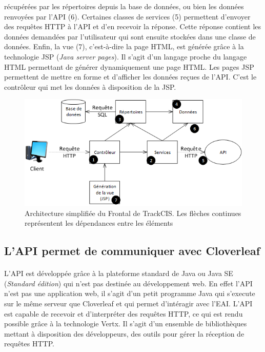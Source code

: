 			récupérées par les répertoires depuis la base de données, ou bien les
			données renvoyées par l'API (6). Certaines classes de services (5)
			permettent d'envoyer des requêtes HTTP à l'API et d'en recevoir la réponse.
			Cette réponse contient les données demandées par l'utilisateur qui sont
			ensuite stockées dans une classe de données. Enfin, la vue (7), c'est-à-dire
			la page HTML, est générée grâce à la technologie JSP (\textit{Java server
			pages}).
			Il s'agit d'un langage proche du langage HTML permettant de générer
			dynamiquement une page HTML.
			Les pages JSP permettent de mettre en forme et d'afficher les données reçues
			de l'API. C'est le contrôleur qui met les données à disposition de la JSP.
			\begin{figure}[H]
				\centering
				\includegraphics[width=15cm]{../img/part3/archi_actuelle_front.png}
				\caption{\label{archi_actuelle_front} Architecture simplifiée du Frontal
				de TrackCIS. Les flèches continues représentent les dépendances entre les
				éléments}
			\end{figure}
			
		\subsection{L'API permet de communiquer avec Cloverleaf}
			\paragraph{}%
			L'API est développée grâce à la plateforme standard de Java ou Java SE
			(\textit{Standard édition}) qui n'est pas destinée au développement web. En
			effet l'API n'est pas une application web, il s'agit d'un petit programme Java qui
			s'execute sur le même serveur que Cloverleaf et qui permet d'intéragir avec
			l'EAI. L'API est capable de recevoir et d'interpréter des requêtes
			HTTP, ce qui est rendu possible grâce à la technologie Vertx. Il s'agit
			d'un ensemble de bibliothèques mettant à disposition des
			développeurs, des outils pour gérer la réception de requêtes HTTP.
			
